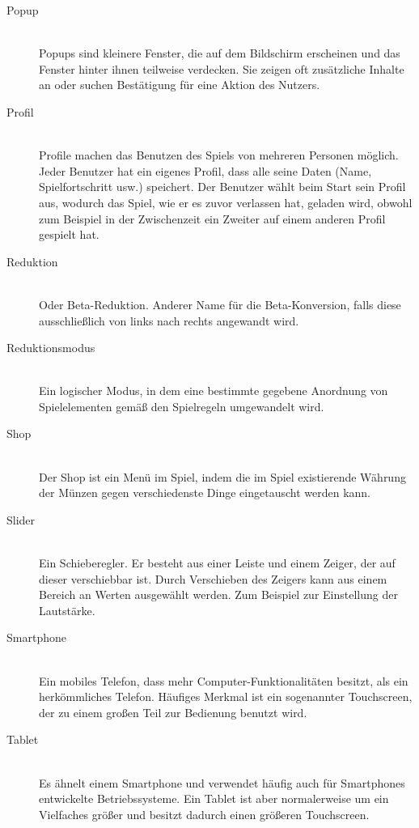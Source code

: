 \begin{description}
	\item[Popup] \hfill \\
	Popups sind kleinere Fenster, die auf dem Bildschirm erscheinen und das Fenster hinter ihnen teilweise verdecken.
	Sie zeigen oft zusätzliche Inhalte an oder suchen Bestätigung für eine Aktion des Nutzers.
	
	\item[Profil] \hfill \\
	Profile machen das Benutzen des Spiels von mehreren Personen möglich. Jeder Benutzer hat ein eigenes Profil,
	dass alle seine Daten (Name, Spielfortschritt usw.) speichert. Der Benutzer wählt beim Start sein Profil aus, wodurch das Spiel,
	wie er es zuvor verlassen hat, geladen wird, obwohl zum Beispiel in der Zwischenzeit ein Zweiter auf einem anderen Profil gespielt hat.
	
	\item[Reduktion] \hfill \\
	Oder Beta-Reduktion. Anderer Name für die Beta-Konversion, falls diese ausschließlich von links nach rechts angewandt wird.
	
	\item[Reduktionsmodus] \hfill \\
	Ein logischer Modus, in dem eine bestimmte gegebene Anordnung von Spielelementen gemäß den Spielregeln umgewandelt wird.
	
	\item[Shop] \hfill \\
	Der Shop ist ein Menü im Spiel, indem die im Spiel existierende Währung der Münzen gegen verschiedenste Dinge eingetauscht werden kann.
	
	\item[Slider] \hfill \\
	Ein Schieberegler. Er besteht aus einer Leiste und einem Zeiger, der auf dieser verschiebbar ist. Durch Verschieben des Zeigers kann aus 
	einem Bereich an Werten ausgewählt werden. Zum Beispiel zur Einstellung der Lautstärke.
	
	\item[Smartphone] \hfill \\
	Ein mobiles Telefon, dass mehr Computer-Funktionalitäten besitzt, als ein herkömmliches Telefon. Häufiges Merkmal ist ein sogenannter
	Touchscreen, der zu einem großen Teil zur Bedienung benutzt wird.
	
	\item[Tablet] \hfill \\
	Es ähnelt einem Smartphone und verwendet häufig auch für Smartphones entwickelte Betriebssysteme. 
	Ein Tablet ist aber normalerweise um ein Vielfaches größer und besitzt dadurch einen größeren Touchscreen.


\end{description}
